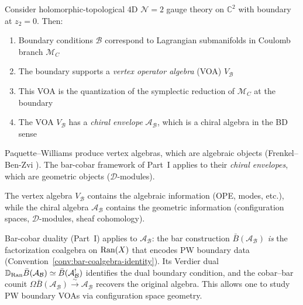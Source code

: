 \begin{theorem}\label{thm:paquette-williams-boundaries}
\cite{PW22} Consider holomorphic-topological 4D $\mathcal{N}=2$ gauge theory on 
$\mathbb{C}^2$ with boundary at $z_2 = 0$. Then:
\begin{enumerate}
\item Boundary conditions $\mathcal{B}$ correspond to Lagrangian submanifolds in 
      Coulomb branch $\mathcal{M}_C$
      
\item The boundary supports a \emph{vertex operator algebra} (VOA) $V_{\mathcal{B}}$

\item This VOA is the quantization of the symplectic reduction of $\mathcal{M}_C$ 
      at the boundary
      
\item The VOA $V_{\mathcal{B}}$ has a \emph{chiral envelope} $\mathcal{A}_{\mathcal{B}}$,
      which is a chiral algebra in the BD sense
\end{enumerate}
\end{theorem}

\begin{remark}\label{rem:PW-connection}
Paquette--Williams produce vertex algebras, which are algebraic objects (Frenkel--Ben-Zvi
\cite{FBZ04}). The bar-cobar framework of Part~I applies to their \emph{chiral envelopes}, which are
geometric objects ($\mathcal{D}$-modules).

\begin{center}
\end{center}

The vertex algebra $V_{\mathcal{B}}$ contains the algebraic information (OPE, modes, 
etc.), while the chiral algebra $\mathcal{A}_{\mathcal{B}}$ contains the geometric 
information (configuration spaces, $\mathcal{D}$-modules, sheaf cohomology).

Bar-cobar duality (Part~I) applies to $\mathcal{A}_{\mathcal{B}}$: the bar construction $\bar{B}(\mathcal{A}_{\mathcal{B}})$ \emph{is} the factorization coalgebra on $\operatorname{Ran}(X)$ that encodes PW boundary data (Convention~\ref{conv:bar-coalgebra-identity}).  Its Verdier dual $\mathbb{D}_{\operatorname{Ran}}\bar{B}(\mathcal{A}_{\mathcal{B}}) \simeq \bar{B}(\mathcal{A}_{\mathcal{B}}^!)$ identifies the dual boundary condition, and the cobar--bar counit $\Omega\bar{B}(\mathcal{A}_{\mathcal{B}}) \xrightarrow{\sim} \mathcal{A}_{\mathcal{B}}$ recovers the original algebra.  This allows one to study PW boundary VOAs via configuration space geometry.
\end{remark}


